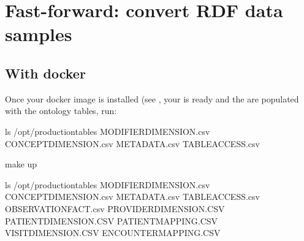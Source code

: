 \documentclass[letterpaper,10pt,english]{sphinxmanual}
\begin{document}
\section{Fast-forward: convert RDF data samples}
\label{\detokenize{run_data:fast-forward-convert-rdf-data-samples}}\label{\detokenize{run_data:run-data}}\label{\detokenize{run_data::doc}}

\subsection{With docker}
\label{\detokenize{run_data:with-docker}}
Once your docker image is installed (see {\hyperref[\detokenize{installation:installation}]{}}, your {\hyperref[\detokenize{configuration:configuration}]{}} is ready and the {\hyperref[\detokenize{structure:structure}]{}} are populated with the ontology tables, run:
\def\sphinxLiteralBlockLabel{\label{\detokenize{run_data:id1}}}
%
\begin{sphinxVerbatim}[commandchars=\\\{\}]
\PYGZdl{} ls /opt/production\PYGZus{}tables
        MODIFIER\PYGZus{}DIMENSION.csv CONCEPT\PYGZus{}DIMENSION.csv METADATA.csv TABLE\PYGZus{}ACCESS.csv

\PYGZdl{} make up


\PYGZdl{} ls /opt/production\PYGZus{}tables
        MODIFIER\PYGZus{}DIMENSION.csv CONCEPT\PYGZus{}DIMENSION.csv METADATA.csv TABLE\PYGZus{}ACCESS.csv
        OBSERVATION\PYGZus{}FACT.csv PROVIDER\PYGZus{}DIMENSION.CSV PATIENT\PYGZus{}DIMENSION.CSV PATIENT\PYGZus{}MAPPING.CSV
        VISIT\PYGZus{}DIMENSION.CSV ENCOUNTER\PYGZus{}MAPPING.CSV
\end{sphinxVerbatim}
\sphinxresetverbatimhllines
\end{document}
